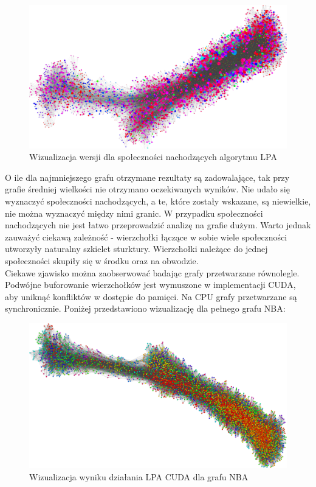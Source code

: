 \documentclass{article}
\begin{document}
\begin{figure}[H]
\centering
\includegraphics[width=\textwidth]{images/ms-ol-nba.png}
\caption{Wizualizacja wersji dla społeczności nachodzących algorytmu LPA}
\end{figure}

O ile dla najmniejszego grafu otrzymane rezultaty są zadowalające, tak przy grafie średniej wielkości nie otrzymano oczekiwanych wyników. Nie udało się wyznaczyć społeczności nachodzących, a te, które zostały wskazane, są niewielkie, nie można wyznaczyć między nimi granic. W przypadku społeczności nachodzących nie jest łatwo przeprowadzić analizę na grafie dużym. Warto jednak zauważyć ciekawą zależność - wierzchołki łączące w sobie wiele społeczności utworzyły naturalny szkielet sturktury. Wierzchołki należące do jednej społeczności skupiły się w środku oraz na obwodzie.\\

Ciekawe zjawisko można zaobserwować badając grafy przetwarzane równolegle. Podwójne buforowanie wierzchołków jest wymuszone w implementacji CUDA, aby uniknąć konfliktów w dostępie do pamięci. Na CPU grafy przetwarzane są synchronicznie. Poniżej przedstawiono wizualizację dla pełnego grafu NBA:

\begin{figure}[H]
\centering
\includegraphics[width=\textwidth]{images/ms-cuda.png}
\caption{Wizualizacja wyniku działania LPA CUDA dla grafu NBA}
\end{figure}
\end{document}
